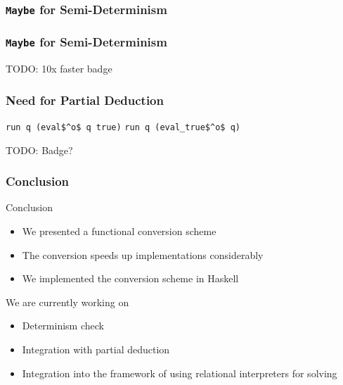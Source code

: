 \documentclass[xcolor=table, aspectratio=169]{beamer}
\begin{document}
\begin{frame}[fragile]
  \frametitle{\lstinline[basicstyle=\Large]{Maybe} for Semi-Determinism}
\begin{center}
  \begin{minipage}{0.43\textwidth}
    
  \end{minipage}
\end{center}
\end{frame}


\begin{frame}[noframenumbering]
  \frametitle{\lstinline[basicstyle=\Large]{Maybe} for Semi-Determinism}
  \begin{center}
  \begin{minipage}{0.43\textwidth}
    
  \end{minipage}
  TODO: 10x faster badge
\end{center}
\end{frame}

\begin{frame}[fragile]
  \frametitle{Need for Partial Deduction}

\begin{center}
\begin{minipage}{0.3\textwidth}
  \lstinline{run q (eval$^o$ q true)}
  \lstinline{run q (eval_true$^o$ q)}

  TODO: Badge?
\end{minipage}


\end{center}


\end{frame}

\begin{frame}[fragile]
  \frametitle{Conclusion}
Conclusion
  \begin{itemize}
    \item We presented a functional conversion scheme
    \item The conversion speeds up implementations considerably
    \item We implemented the conversion scheme in Haskell
  \end{itemize}

\vfill

We are currently working on
  \begin{itemize}
    \item Determinism check
    \item Integration with partial deduction
    \item Integration into the framework of using relational interpreters for solving
  \end{itemize}
\end{frame}
\end{document}
